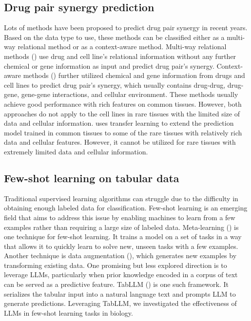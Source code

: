 \subsection{Drug pair synergy prediction}
Lots of methods have been proposed to predict drug pair synergy in recent years. Based on the data type to use, these methods can be classified either as a multi-way relational method or as a context-aware method. Multi-way relational methods (\cite{chen_drugcom_2018, 10.1093/bioinformatics/btaa287, 10.1093/bioinformatics/btac579}) use drug and cell line's relational information without any further chemical or gene information as input and predict drug pair’s synergy. Context-aware methods (\cite{preuer_deepsynergy_2018, liu_transynergy_2021, kuru_matchmaker_2022, hosseini_ccsynergy_2023}) further utilized chemical and gene information from drugs and cell lines to predict drug pair's synergy, which usually contains drug-drug, drug-gene, gene-gene interactions, and cellular environment. These methods usually achieve good performance with rich features on common tissues. However, both approaches do not apply to the cell lines in rare tissues with the limited size of data and cellular information. \cite{kim_anticancer_2021} uses transfer learning to extend the prediction model trained in common tissues to some of the rare tissues with relatively rich data and cellular features. However, it cannot be utilized for rare tissues with extremely limited data and cellular information.

\subsection{Few-shot learning on tabular data}
Traditional supervised learning algorithms can struggle due to the difficulty in obtaining enough labeled data for classification. Few-shot learning is an emerging field that aims to address this issue by enabling machines to learn from a few examples rather than requiring a large size of labeled data. Meta-learning (\cite{finn_model-agnostic_2017, Wang2023-iw, Gao2023-se}) is one technique for few-shot learning. It trains a model on a set of tasks in a way that allows it to quickly learn to solve new, unseen tasks with a few examples. Another technique is data augmentation (\cite{nam_stunt_2023, Yang2022-ne}), which generates new examples by transforming existing data. One promising but less explored direction is to leverage LLMs, particularly when prior knowledge encoded in a corpus of text can be served as a predictive feature. TabLLM (\cite{hegselmann_tabllm_2023}) is one such framework.  It serializes the tabular input into a natural language text and prompts LLM to generate predictions. Leveraging TabLLM, we investigated the effectiveness of LLMs in few-shot learning tasks in biology. 

